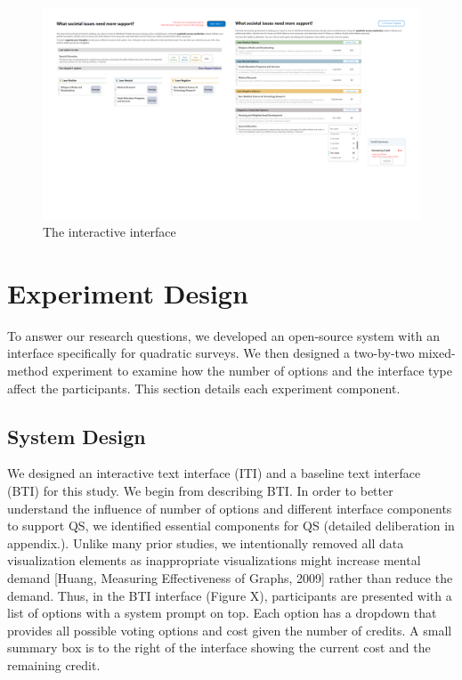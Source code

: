 \begin{figure}[h]
    \centering
    \includegraphics[width=1\textwidth]{content/image/interface.png}
    \caption{The interactive interface}
    \label{fig:interactiveInterface}
\end{figure}

\section{Experiment Design}
To answer our research questions, we developed an open-source system with an interface specifically for quadratic surveys. We then designed a two-by-two mixed-method experiment to examine how the number of options and the interface type affect the participants. This section details each experiment component.

\subsection{System Design}
We designed an interactive text interface (ITI) and a baseline text interface (BTI) for this study. We begin from describing BTI. In order to better understand the influence of number of options and different interface components to support QS, we identified essential components for QS (detailed deliberation in appendix.). Unlike many prior studies, we intentionally removed all data visualization elements as inappropriate visualizations might increase mental demand [Huang, Measuring Effectiveness of Graphs, 2009] rather than reduce the demand. Thus, in the BTI interface (Figure X), participants are presented with a list of options with a system prompt on top. Each option has a dropdown that provides all possible voting options and cost given the number of credits. A small summary box is to the right of the interface showing the current cost and the remaining credit.

